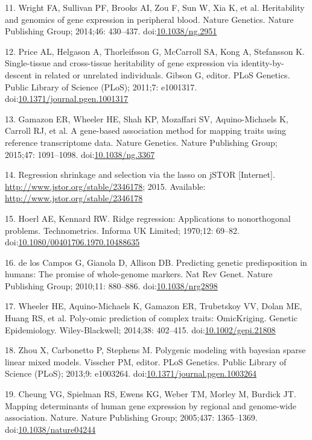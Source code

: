\documentclass[]{article}
\begin{document}
11. Wright FA, Sullivan PF, Brooks AI, Zou F, Sun W, Xia K, et al.
Heritability and genomics of gene expression in peripheral blood. Nature
Genetics. Nature Publishing Group; 2014;46: 430--437.
doi:\href{http://dx.doi.org/10.1038/ng.2951}{10.1038/ng.2951}

12. Price AL, Helgason A, Thorleifsson G, McCarroll SA, Kong A,
Stefansson K. Single-tissue and cross-tissue heritability of gene
expression via identity-by-descent in related or unrelated individuals.
Gibson G, editor. PLoS Genetics. Public Library of Science (PLoS);
2011;7: e1001317.
doi:\href{http://dx.doi.org/10.1371/journal.pgen.1001317}{10.1371/journal.pgen.1001317}

13. Gamazon ER, Wheeler HE, Shah KP, Mozaffari SV, Aquino-Michaels K,
Carroll RJ, et al. A gene-based association method for mapping traits
using reference transcriptome data. Nature Genetics. Nature Publishing
Group; 2015;47: 1091--1098.
doi:\href{http://dx.doi.org/10.1038/ng.3367}{10.1038/ng.3367}

14. Regression shrinkage and selection via the lasso on jSTOR
{[}Internet{]}. \url{http://www.jstor.org/stable/2346178}; 2015.
Available: \url{http://www.jstor.org/stable/2346178}

15. Hoerl AE, Kennard RW. Ridge regression: Applications to
nonorthogonal problems. Technometrics. Informa UK Limited; 1970;12:
69--82.
doi:\href{http://dx.doi.org/10.1080/00401706.1970.10488635}{10.1080/00401706.1970.10488635}

16. {de los Campos} G, Gianola D, Allison DB. Predicting genetic
predisposition in humans: The promise of whole-genome markers. Nat Rev
Genet. Nature Publishing Group; 2010;11: 880--886.
doi:\href{http://dx.doi.org/10.1038/nrg2898}{10.1038/nrg2898}

17. Wheeler HE, Aquino-Michaels K, Gamazon ER, Trubetskoy VV, Dolan ME,
Huang RS, et al. Poly-omic prediction of complex traits: OmicKriging.
Genetic Epidemiology. Wiley-Blackwell; 2014;38: 402--415.
doi:\href{http://dx.doi.org/10.1002/gepi.21808}{10.1002/gepi.21808}

18. Zhou X, Carbonetto P, Stephens M. Polygenic modeling with bayesian
sparse linear mixed models. Visscher PM, editor. PLoS Genetics. Public
Library of Science (PLoS); 2013;9: e1003264.
doi:\href{http://dx.doi.org/10.1371/journal.pgen.1003264}{10.1371/journal.pgen.1003264}

19. Cheung VG, Spielman RS, Ewens KG, Weber TM, Morley M, Burdick JT.
Mapping determinants of human gene expression by regional and
genome-wide association. Nature. Nature Publishing Group; 2005;437:
1365--1369.
doi:\href{http://dx.doi.org/10.1038/nature04244}{10.1038/nature04244}
\end{document}
